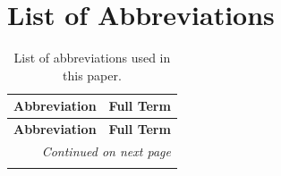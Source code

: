 \section*{List of Abbreviations}

\begin{center}
\begin{longtable}{ll}
\caption{List of abbreviations used in this paper.}
\label{tab:abbreviations} \\

\hline
\textbf{Abbreviation} & \textbf{Full Term} \\
\hline
\endfirsthead

\hline
\textbf{Abbreviation} & \textbf{Full Term} \\
\hline
\endhead

\hline
\multicolumn{2}{r}{\textit{Continued on next page}} \\
\endfoot

\hline
\endlastfoot


\end{longtable}
\end{center}
